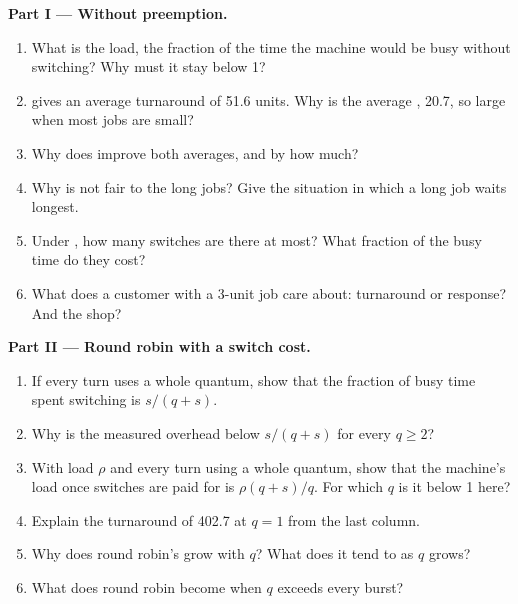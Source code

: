 \begin{problem}
\medskip\noindent\textbf{Part I --- Without preemption.}
\begin{enumerate}
\item What is the load, the fraction of the time the machine would be busy without switching? Why must it stay below 1?
\item {} gives an average turnaround of 51.6 units. Why is the average , 20.7, so large when most jobs are small?
\item Why does  improve both averages, and by how much?
\item Why is  not fair to the long jobs? Give the situation in which a long job waits longest.
\item Under , how many switches are there at most? What fraction of the busy time do they cost?
\item What does a customer with a 3-unit job care about: turnaround or response? And the shop?
\end{enumerate}

\medskip\noindent\textbf{Part II --- Round robin with a switch cost.}
\begin{enumerate}[resume]
\item If every turn uses a whole quantum, show that the fraction of busy time spent switching is $s/(q + s)$.
\item Why is the measured overhead below $s/(q + s)$ for every $q \ge 2$?
\item With load $\rho$ and every turn using a whole quantum, show that the machine's load once switches are paid for is $\rho (q + s)/q$. For which $q$ is it below 1 here?
\item Explain the turnaround of 402.7 at $q = 1$ from the last column.
\item Why does round robin's  grow with $q$? What does it tend to as $q$ grows?
\item What does round robin become when $q$ exceeds every burst?
\end{enumerate}


\end{problem}
